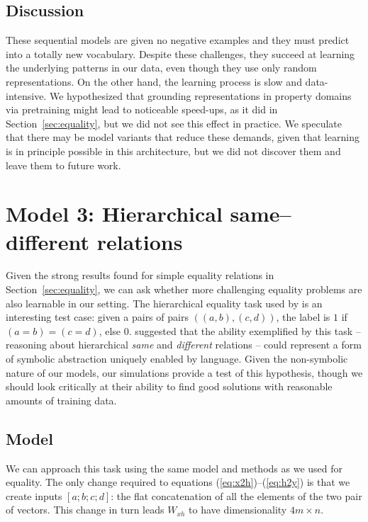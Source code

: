 \documentclass{article}
\newcommand{\secref}[1]{Section~\ref{#1}}
\newcommand{\eg}[1]{(\ref{#1})}
\newcommand{\dasheg}[2]{\eg{#1}--\eg{#2}}
\begin{document}
\subsection{Discussion}

These sequential models are given no negative examples and they must predict into a totally new vocabulary. Despite these challenges, they succeed at learning the underlying patterns in our data, even though they use only random representations. On the other hand, the learning process is slow and data-intensive. We hypothesized that grounding representations in property domains via pretraining might lead to noticeable speed-ups, as it did in \secref{sec:equality}, but we did not see this effect in practice. We speculate that there may be model variants that reduce these demands, given that learning is in principle possible in this architecture, but we did not discover them and leave them to future work.

\section{Model 3: Hierarchical same--different relations}\label{sec:premack}

Given the strong results found for simple equality relations in \secref{sec:equality}, we can ask whether more challenging equality problems are also learnable in our setting. The hierarchical equality task used by \citet{Premack:1983} is an interesting test case: given a pairs of pairs $((a,b), (c,d))$, the label is $1$ if $(a = b) = (c = d)$, else $0$. \citet{Premack:1983} suggested that the ability exemplified by this task -- reasoning about hierarchical \emph{same} and \emph{different} relations -- could represent a form of symbolic abstraction uniquely enabled by language. Given the non-symbolic nature of our models, our simulations provide a test of this hypothesis, though we should look critically at their ability to find good solutions with reasonable amounts of training data.

\subsection{Model}

We can approach this task using the same model and methods as we used for equality. The only change required to equations \dasheg{eq:x2h}{eq:h2y} is that we create inputs $[a;b;c;d]$: the flat concatenation of all the elements of the two pair of vectors. This change in turn leads $W_{xh}$ to have dimensionality $4m \times n$.
\end{document}
